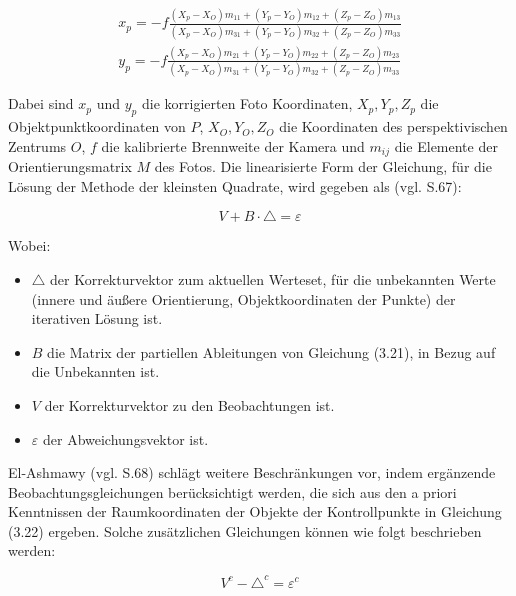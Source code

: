 \begin{equation}
\begin{aligned}
  x_p = -f \frac{(X_p-X_O)m_{11}+(Y_p-Y_O)m_{12}+(Z_p-Z_O)m_{13}}{(X_p-X_O)m_{31}+(Y_p-Y_O)m_{32}+(Z_p-Z_O)m_{33}} \\
    y_p = -f \frac{(X_p-X_O)m_{21}+(Y_p-Y_O)m_{22}+(Z_p-Z_O)m_{23}}{(X_p-X_O)m_{31}+(Y_p-Y_O)m_{32}+(Z_p-Z_O)m_{33}}
\end{aligned}
\end{equation}

Dabei sind $x_p$ und $y_p$ die korrigierten Foto Koordinaten, $X_p,Y_p,Z_p$ die Objektpunktkoordinaten von $P$, $X_O,Y_O,Z_O$ die Koordinaten des perspektivischen Zentrums $O$, $f$ die kalibrierte Brennweite der Kamera und $m_{ij}$ die Elemente der Orientierungsmatrix $M$ des Fotos. Die linearisierte Form der Gleichung, für die Lösung der Methode der kleinsten Quadrate, wird gegeben als (vgl. \cite{comparative_conditions_study} S.67):

\begin{equation}
V+B\cdot\triangle =\varepsilon
\end{equation}

Wobei:
\begin{itemize}
\item $\triangle$ der Korrekturvektor zum aktuellen Werteset, für die unbekannten Werte (innere und äußere Orientierung, Objektkoordinaten der Punkte) der iterativen Lösung ist.

\item $B$ die Matrix der partiellen Ableitungen von Gleichung (3.21), in Bezug auf die Unbekannten  ist.

\item $V$ der Korrekturvektor zu den Beobachtungen ist.

\item $\varepsilon$ der Abweichungsvektor ist.
\end{itemize}

El-Ashmawy (vgl. \cite{comparative_conditions_study} S.68) schlägt weitere Beschränkungen vor, indem ergänzende Beobachtungsgleichungen berücksichtigt werden, die sich aus den a priori Kenntnissen der Raumkoordinaten der Objekte der Kontrollpunkte in Gleichung (3.22) ergeben. Solche zusätzlichen Gleichungen können wie folgt beschrieben werden:

\begin{equation}
V^c-\triangle^c = \varepsilon^c
\end{equation}

